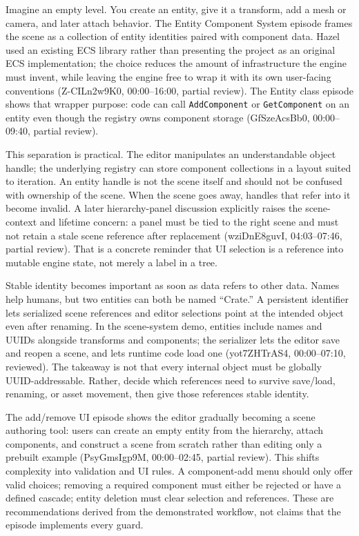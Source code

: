 \hypertarget{06-engine-ii-ch032-a-scene-is-authored-data-with-identity}{}

Imagine an empty level. You create an entity, give it a transform, add a mesh or camera, and later attach behavior. The Entity Component System episode frames the scene as a collection of entity identities paired with component data. Hazel used an existing ECS library rather than presenting the project as an original ECS implementation; the choice reduces the amount of infrastructure the engine must invent, while leaving the engine free to wrap it with its own user-facing conventions (Z-CILn2w9K0, 00:00--16:00, partial review). The Entity class episode shows that wrapper purpose: code can call \texttt{AddComponent} or \texttt{GetComponent} on an entity even though the registry owns component storage (GfSzeAcsBb0, 00:00--09:40, partial review).

This separation is practical. The editor manipulates an understandable object handle; the underlying registry can store component collections in a layout suited to iteration. An entity handle is not the scene itself and should not be confused with ownership of the scene. When the scene goes away, handles that refer into it become invalid. A later hierarchy-panel discussion explicitly raises the scene-context and lifetime concern: a panel must be tied to the right scene and must not retain a stale scene reference after replacement (wziDnE8guvI, 04:03--07:46, partial review). That is a concrete reminder that UI selection is a reference into mutable engine state, not merely a label in a tree.

Stable identity becomes important as soon as data refers to other data. Names help humans, but two entities can both be named ``Crate.'' A persistent identifier lets serialized scene references and editor selections point at the intended object even after renaming. In the scene-system demo, entities include names and UUIDs alongside transforms and components; the serializer lets the editor save and reopen a scene, and lets runtime code load one (yot7ZHTrAS4, 00:00--07:10, reviewed). The takeaway is not that every internal object must be globally UUID-addressable. Rather, decide which references need to survive save/load, renaming, or asset movement, then give those references stable identity.

The add/remove UI episode shows the editor gradually becoming a scene authoring tool: users can create an empty entity from the hierarchy, attach components, and construct a scene from scratch rather than editing only a prebuilt example (PsyGmsIgp9M, 00:00--02:45, partial review). This shifts complexity into validation and UI rules. A component-add menu should only offer valid choices; removing a required component must either be rejected or have a defined cascade; entity deletion must clear selection and references. These are recommendations derived from the demonstrated workflow, not claims that the episode implements every guard.

